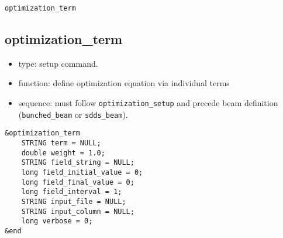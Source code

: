 \documentclass[11pt]{article}
\begin{document}
\newpage
\begin{center}{\Large\verb|optimization_term|}\end{center}
\subsection{optimization\_term \label{subsec:optimizationterm}}

\begin{itemize}
\item type: setup command.
\item function: define optimization equation via individual terms
\item sequence: must follow \verb|optimization_setup| and precede beam definition (\verb|bunched_beam| or \verb|sdds_beam|).
\end{itemize}

\begin{verbatim}
&optimization_term
    STRING term = NULL;
    double weight = 1.0;
    STRING field_string = NULL;
    long field_initial_value = 0;
    long field_final_value = 0;
    long field_interval = 1;
    STRING input_file = NULL;
    STRING input_column = NULL;
    long verbose = 0;
&end
\end{verbatim}
\end{document}
